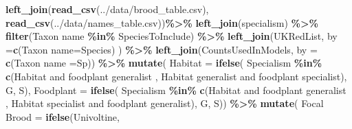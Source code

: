 \documentclass[
]{article}
\newenvironment{Shaded}{\begin{snugshade}}{\end{snugshade}}
\newcommand{\AttributeTok}[1]{\textcolor[rgb]{0.13,0.29,0.53}{#1}}
\newcommand{\FunctionTok}[1]{\textcolor[rgb]{0.13,0.29,0.53}{\textbf{#1}}}
\newcommand{\NormalTok}[1]{#1}
\newcommand{\OtherTok}[1]{\textcolor[rgb]{0.56,0.35,0.01}{#1}}
\newcommand{\SpecialCharTok}[1]{\textcolor[rgb]{0.81,0.36,0.00}{\textbf{#1}}}
\newcommand{\StringTok}[1]{\textcolor[rgb]{0.31,0.60,0.02}{#1}}
\begin{document}
\begin{Shaded}
\begin{Highlighting}[]
\FunctionTok{left\_join}\NormalTok{(}\FunctionTok{read\_csv}\NormalTok{(}\StringTok{\textquotesingle{}../data/brood\_table.csv\textquotesingle{}}\NormalTok{),}
          \FunctionTok{read\_csv}\NormalTok{(}\StringTok{\textquotesingle{}../data/names\_table.csv\textquotesingle{}}\NormalTok{))}\SpecialCharTok{\%\textgreater{}\%}
  \FunctionTok{left\_join}\NormalTok{(specialism) }\SpecialCharTok{\%\textgreater{}\%}
  \FunctionTok{filter}\NormalTok{(}\StringTok{\textasciigrave{}}\AttributeTok{Taxon name}\StringTok{\textasciigrave{}}  \SpecialCharTok{\%in\%}\NormalTok{  SpeciesToInclude) }\SpecialCharTok{\%\textgreater{}\%}
  \FunctionTok{left\_join}\NormalTok{(UKRedList, }\AttributeTok{by =}\FunctionTok{c}\NormalTok{(}\StringTok{\textquotesingle{}Taxon name\textquotesingle{}}\OtherTok{=}\StringTok{\textquotesingle{}Species\textquotesingle{}}\NormalTok{) ) }\SpecialCharTok{\%\textgreater{}\%}
  \FunctionTok{left\_join}\NormalTok{(CountsUsedInModels, }\AttributeTok{by =} \FunctionTok{c}\NormalTok{(}\StringTok{\textquotesingle{}Taxon name\textquotesingle{}} \OtherTok{=}\StringTok{\textquotesingle{}Sp\textquotesingle{}}\NormalTok{)) }\SpecialCharTok{\%\textgreater{}\%}
  \FunctionTok{mutate}\NormalTok{( }\AttributeTok{Habitat =} \FunctionTok{ifelse}\NormalTok{( Specialism }\SpecialCharTok{\%in\%} \FunctionTok{c}\NormalTok{(}\StringTok{\textquotesingle{}Habitat and foodplant generalist\textquotesingle{}}\NormalTok{ ,}
                                              \StringTok{\textquotesingle{}Habitat generalist and foodplant specialist\textquotesingle{}}\NormalTok{),}
                            \StringTok{\textquotesingle{}G\textquotesingle{}}\NormalTok{, }\StringTok{\textquotesingle{}S\textquotesingle{}}\NormalTok{),}
          \AttributeTok{Foodplant =} \FunctionTok{ifelse}\NormalTok{( Specialism }\SpecialCharTok{\%in\%} \FunctionTok{c}\NormalTok{(}\StringTok{\textquotesingle{}Habitat and foodplant generalist\textquotesingle{}}\NormalTok{ ,}
                                                \StringTok{\textquotesingle{}Habitat specialist and foodplant generalist\textquotesingle{}}\NormalTok{),}
                              \StringTok{\textquotesingle{}G\textquotesingle{}}\NormalTok{, }\StringTok{\textquotesingle{}S\textquotesingle{}}\NormalTok{)) }\SpecialCharTok{\%\textgreater{}\%}
  \FunctionTok{mutate}\NormalTok{( }\StringTok{\textasciigrave{}}\AttributeTok{Focal Brood}\StringTok{\textasciigrave{}} \OtherTok{=} \FunctionTok{ifelse}\NormalTok{(Univoltine,}

\end{Highlighting}
\end{Shaded}
\end{document}
